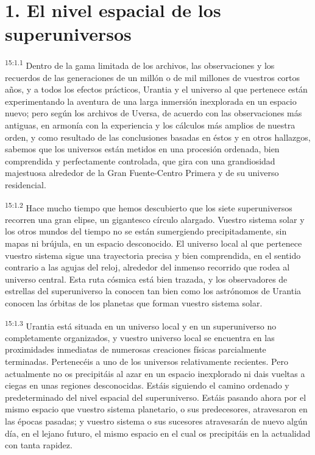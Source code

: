 \section*{1. El nivel espacial de los superuniversos}
\par
\textsuperscript{15:1.1} Dentro de la gama limitada de los archivos, las observaciones y los recuerdos de las generaciones de un millón o de mil millones de vuestros cortos años, y a todos los efectos prácticos, Urantia y el universo al que pertenece están experimentando la aventura de una larga inmersión inexplorada en un espacio nuevo; pero según los archivos de Uversa, de acuerdo con las observaciones más antiguas, en armonía con la experiencia y los cálculos más amplios de nuestra orden, y como resultado de las conclusiones basadas en éstos y en otros hallazgos, sabemos que los universos están metidos en una procesión ordenada, bien comprendida y perfectamente controlada, que gira con una grandiosidad majestuosa alrededor de la Gran Fuente-Centro Primera y de su universo residencial.

\par
\textsuperscript{15:1.2} Hace mucho tiempo que hemos descubierto que los siete superuniversos recorren una gran elipse, un gigantesco círculo alargado. Vuestro sistema solar y los otros mundos del tiempo no se están sumergiendo precipitadamente, sin mapas ni brújula, en un espacio desconocido. El universo local al que pertenece vuestro sistema sigue una trayectoria precisa y bien comprendida, en el sentido contrario a las agujas del reloj, alrededor del inmenso recorrido que rodea al universo central. Esta ruta cósmica está bien trazada, y los observadores de estrellas del superuniverso la conocen tan bien como los astrónomos de Urantia conocen las órbitas de los planetas que forman vuestro sistema solar.

\par
\textsuperscript{15:1.3} Urantia está situada en un universo local y en un superuniverso no completamente organizados, y vuestro universo local se encuentra en las proximidades inmediatas de numerosas creaciones físicas parcialmente terminadas. Pertenecéis a uno de los universos relativamente recientes. Pero actualmente no os precipitáis al azar en un espacio inexplorado ni dais vueltas a ciegas en unas regiones desconocidas. Estáis siguiendo el camino ordenado y predeterminado del nivel espacial del superuniverso. Estáis pasando ahora por el mismo espacio que vuestro sistema planetario, o sus predecesores, atravesaron en las épocas pasadas; y vuestro sistema o sus sucesores atravesarán de nuevo algún día, en el lejano futuro, el mismo espacio en el cual os precipitáis en la actualidad con tanta rapidez.


